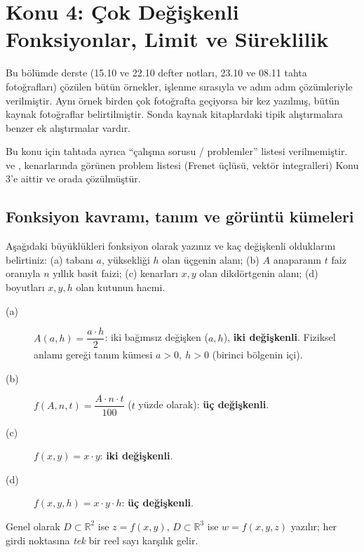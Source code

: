 \section{Konu 4: Çok Değişkenli Fonksiyonlar, Limit ve Süreklilik}

Bu bölümde derste (15.10 ve 22.10 defter notları, 23.10 ve 08.11 tahta fotoğrafları) çözülen bütün örnekler, işlenme
sırasıyla ve adım adım çözümleriyle verilmiştir. Aynı örnek birden çok fotoğrafta geçiyorsa bir kez yazılmış, bütün
kaynak fotoğraflar belirtilmiştir. Sonda kaynak kitaplardaki tipik alıştırmalara benzer ek alıştırmalar vardır.

\begin{bilgi}
Bu konu için tahtada ayrıca ``çalışma sorusu / problemler'' listesi verilmemiştir.  ve
,  kenarlarında görünen problem listesi (Frenet üçlüsü, vektör
integralleri) Konu 3'e aittir ve orada çözülmüştür.
\end{bilgi}

\subsection{Fonksiyon kavramı, tanım ve görüntü kümeleri}

\begin{soru}
Aşağıdaki büyüklükleri fonksiyon olarak yazınız ve kaç değişkenli olduklarını belirtiniz:
(a) tabanı $a$, yüksekliği $h$ olan üçgenin alanı; (b) $A$ anaparanın $t$ faiz oranıyla $n$ yıllık basit faizi;
(c) kenarları $x,y$ olan dikdörtgenin alanı; (d) boyutları $x,y,h$ olan kutunun hacmi.
\end{soru}
\begin{cevap}
\begin{description}
  \item[(a)] $A(a,h)=\dfrac{a\cdot h}{2}$: iki bağımsız değişken ($a,h$), \textbf{iki değişkenli}. Fiziksel anlamı
  gereği tanım kümesi $a>0,\ h>0$ (birinci bölgenin içi).
  \item[(b)] $f(A,n,t)=\dfrac{A\cdot n\cdot t}{100}$ ($t$ yüzde olarak): \textbf{üç değişkenli}.
  \item[(c)] $f(x,y)=x\cdot y$: \textbf{iki değişkenli}.
  \item[(d)] $f(x,y,h)=x\cdot y\cdot h$: \textbf{üç değişkenli}.
\end{description}
Genel olarak $D\subset\mathbb R^2$ ise $z=f(x,y)$, $D\subset\mathbb R^3$ ise $w=f(x,y,z)$ yazılır; her girdi noktasına
\emph{tek} bir reel sayı karşılık gelir.
\end{cevap}

